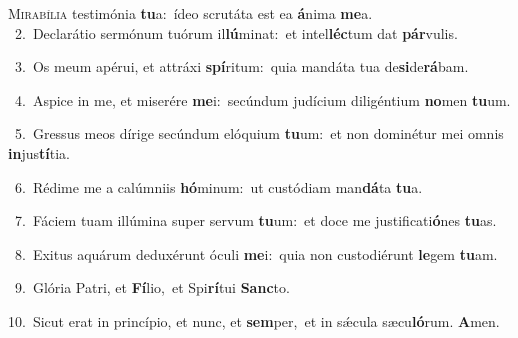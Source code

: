 \lettrine{\initial\textcolor{\initialcolor}{M}}{irabília} testimónia \textbf{tu}\-a:~\star ídeo scrutáta est ea \textbf{á}\-nima \textbf{me}\-a.\\
{\numbfont\textcolor{\numbcolor}{~2.}}~Declarátio sermónum tuórum il\-\textbf{lú}\-minat:~\star et intel\-\textbf{léc}\-tum dat \textbf{pár}\-vulis.\par
{\numbfont\textcolor{\numbcolor}{~3.}}~Os meum apérui, et attráxi \textbf{spí}\-ritum:~\star quia mandáta tua de\-\textbf{si}\-de\-\textbf{rá}\-bam.\par
{\numbfont\textcolor{\numbcolor}{~4.}}~Aspice in me, et miserére \textbf{me}\-i:~\star secúndum judícium diligéntium \textbf{no}\-men \textbf{tu}\-um.\par
{\numbfont\textcolor{\numbcolor}{~5.}}~Gressus meos dírige secúndum elóquium \textbf{tu}\-um:~\star et non dominétur mei omnis \textbf{in}\-jus\-\textbf{tí}\-tia.\par
{\numbfont\textcolor{\numbcolor}{~6.}}~Rédime me a calúmniis \textbf{hó}\-minum:~\star ut custódiam man\-\textbf{dá}\-ta \textbf{tu}\-a.\par
{\numbfont\textcolor{\numbcolor}{~7.}}~Fáciem tuam illúmina super servum \textbf{tu}\-um:~\star et doce me justificati\-\textbf{ó}\-nes \textbf{tu}\-as.\par
{\numbfont\textcolor{\numbcolor}{~8.}}~Exitus aquárum deduxérunt óculi \textbf{me}\-i:~\star quia non custodiérunt \textbf{le}\-gem \textbf{tu}\-am.\par
{\numbfont\textcolor{\numbcolor}{~9.}}~Glória Patri, et \textbf{Fí}\-lio,~\star et Spi\-\textbf{rí}\-tui \textbf{Sanc}\-to.\par
{\numbfont\textcolor{\numbcolor}{10.}}~Sicut erat in princípio, et nunc, et \textbf{sem}\-per,~\star et in sǽcula sæcu\-\textbf{ló}\-rum. \textbf{A}\-men.\par
